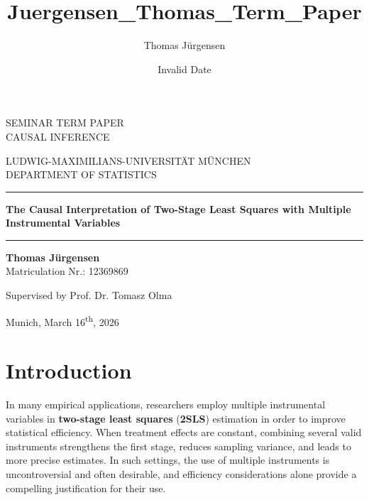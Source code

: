 \documentclass[
  12pt,
  a4paper,
  oneside]{article}
\title{Juergensen\_Thomas\_Term\_Paper}
\author{Thomas Jürgensen}
\date{Invalid Date}
\renewcommand*\contentsname{Table of contents}
\newcommand\contentsname{Table of contents}
\renewcommand*\listfigurename{List of Figures}
\newcommand\listfigurename{List of Figures}
\renewcommand*\listtablename{List of Tables}
\newcommand\listtablename{List of Tables}
\begin{document}
\begin{titlepage}
\begin{center}

\Large
SEMINAR TERM PAPER\\
CAUSAL INFERENCE

\vspace{0.5cm}
\Large
LUDWIG-MAXIMILIANS-UNIVERSITÄT MÜNCHEN\\
DEPARTMENT OF STATISTICS

\vspace{0.5cm}

\rule{\textwidth}{1.5pt}
\LARGE
\textbf{The Causal Interpretation of Two-Stage Least Squares with Multiple Instrumental Variables}
\rule{\textwidth}{1.5pt}

\vspace{0.5cm}

\Large
\textbf{Thomas Jürgensen}\\
\large
Matriculation Nr.: 12369869

\vspace{0.5cm}

Supervised by Prof. Dr. Tomasz Olma

\vspace{0.5cm}

\large
Munich, March 16\textsuperscript{th}, 2026
      
\vspace{0.5cm}



\vfill

\end{center}
\end{titlepage}
\newpage
\newpage
\renewcommand*\contentsname{Contents}
\setcounter{tocdepth}{3}
\renewcommand*\listfigurename{List of figures}
\renewcommand*\listtablename{List of tables}
\tableofcontents

\newpage

\section{Introduction}\label{sec-intro}

In many empirical applications, researchers employ multiple instrumental
variables in \textbf{two-stage
least squares} (\textbf{2SLS}) estimation in order to improve
statistical efficiency. When treatment effects are constant, combining
several valid instruments strengthens the first stage, reduces sampling
variance, and leads to more precise estimates. In such settings, the use
of multiple instruments is uncontroversial and often desirable, and
efficiency considerations alone provide a compelling justification for
their use.
\end{document}
